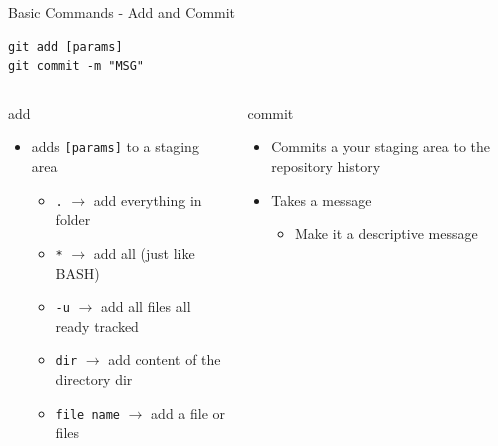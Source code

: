 \documentclass[table,svgnames,aspectratio=169]{beamer}
\begin{document}
\begin{frame}[fragile,label={sec:org747fa41}]{Basic Commands - Add and Commit}
 \lstset{language=bash,label= ,caption= ,captionpos=b,numbers=none}
\begin{lstlisting}
git add [params]
git commit -m "MSG"
\end{lstlisting}

\begin{columns}
\begin{column}[t]{0.5\columnwidth}
\alert{add}
\begin{itemize}
\item adds \texttt{[params]} to a staging area 
\begin{itemize}
\item \texttt{.} \(\rightarrow\) add everything in folder
\item \texttt{*} \(\rightarrow\) add all (just like BASH)
\item \texttt{-u} \(\rightarrow\) add all files all ready tracked
\item \texttt{dir} \(\rightarrow\) add content of the directory dir
\item \texttt{file name} \(\rightarrow\) add a file or files
\end{itemize}
\end{itemize}
\end{column}



\begin{column}[t]{.5\columnwidth}
\alert{commit}
\begin{itemize}
\item Commits a your staging area to the repository history
\item Takes a message 
\begin{itemize}
\item Make it a descriptive message
\end{itemize}
\end{itemize}
\end{column}
\end{columns}
\end{frame}
\end{document}

